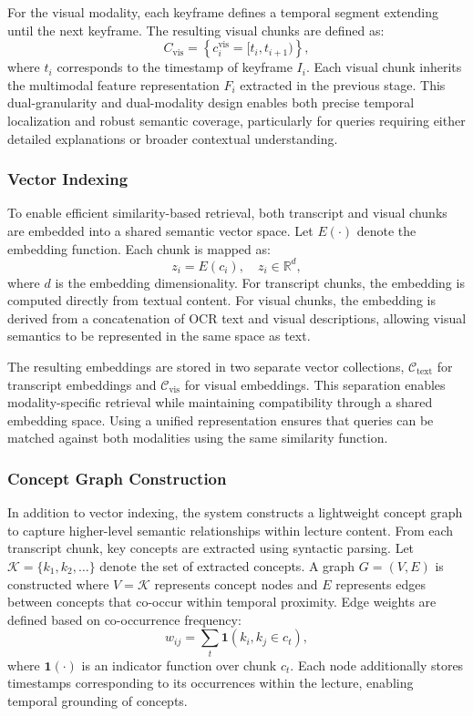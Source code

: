 \documentclass[conference]{IEEEtran}
\begin{document}
    For the visual modality, each keyframe defines a temporal segment extending until the next keyframe. The resulting visual chunks are defined as:
    \begin{equation}
    C_{\text{vis}} = \left\{c_i^{\text{vis}} = [t_i, t_{i+1})\right\},
    \end{equation}
    where $t_i$ corresponds to the timestamp of keyframe $I_i$. Each visual chunk inherits the multimodal feature representation $F_i$ extracted in the previous stage. This dual-granularity and dual-modality design enables both precise temporal localization and robust semantic coverage, particularly for queries requiring either detailed explanations or broader contextual understanding.

    \subsubsection{Vector Indexing}

    To enable efficient similarity-based retrieval, both transcript and visual chunks are embedded into a shared semantic vector space. Let $E(\cdot)$ denote the embedding function. Each chunk is mapped as:
    \begin{equation}
    z_i = E(c_i), \quad z_i \in \mathbb{R}^d,
    \end{equation}
    where $d$ is the embedding dimensionality. For transcript chunks, the embedding is computed directly from textual content. For visual chunks, the embedding is derived from a concatenation of OCR text and visual descriptions, allowing visual semantics to be represented in the same space as text.

    The resulting embeddings are stored in two separate vector collections, $\mathcal{C}_{\text{text}}$ for transcript embeddings and $\mathcal{C}_{\text{vis}}$ for visual embeddings. This separation enables modality-specific retrieval while maintaining compatibility through a shared embedding space. Using a unified representation ensures that queries can be matched against both modalities using the same similarity function.

    \subsubsection{Concept Graph Construction}

    In addition to vector indexing, the system constructs a lightweight concept graph to capture higher-level semantic relationships within lecture content. From each transcript chunk, key concepts are extracted using syntactic parsing. Let $\mathcal{K} = \{k_1, k_2, \dots\}$ denote the set of extracted concepts. A graph $G = (V, E)$ is constructed where $V = \mathcal{K}$ represents concept nodes and $E$ represents edges between concepts that co-occur within temporal proximity. Edge weights are defined based on co-occurrence frequency:
    \begin{equation}
    w_{ij} = \sum_t \mathbf{1}(k_i, k_j \in c_t),
    \end{equation}
    where $\mathbf{1}(\cdot)$ is an indicator function over chunk $c_t$. Each node additionally stores timestamps corresponding to its occurrences within the lecture, enabling temporal grounding of concepts.
\end{document}
